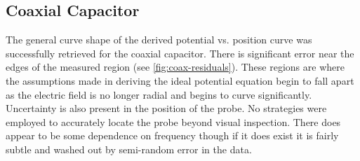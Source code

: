 \documentclass[10pt, twocolumn]{article}
\theoremstyle{definition}
\begin{document}
\subsection{Coaxial Capacitor}
The general curve shape of the derived potential vs. position curve was successfully retrieved for the coaxial capacitor.
There is significant error near the edges of the measured region (see \ref{fig:coax-residuals}).
These regions are where the assumptions made in deriving
the ideal potential equation begin to fall apart as the electric field is no longer radial and begins to curve significantly.
Uncertainty is also present in the position of the probe. No strategies were employed to accurately locate the probe beyond visual inspection.
There does appear to be some dependence on frequency though if it does exist it is fairly subtle and washed out by semi-random error
in the data.
\end{document}
